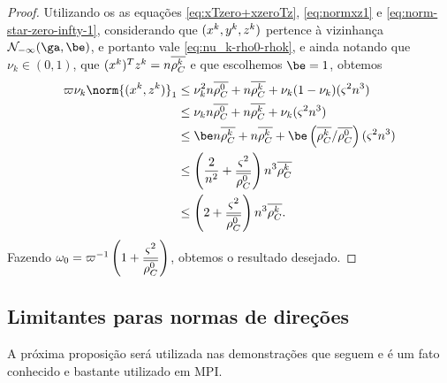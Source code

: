 \begin{proof}
Utilizando os as equações \eqref{eq:xTzero+xzeroTz},  \eqref{eq:normxz1} e \eqref{eq:norm-star-zero-infty-1}, considerando que $(x^{k},y^{k},z^{k})$ pertence à vizinhança $\Nset_{-\infty}(\ga,\be)$, e portanto vale  \eqref{eq:nu_k-rho0-rhok}, e ainda notando que  $\nu_k\in(0,1)$, que $(x^{k})^{T}z^{k} = n\overline{\rho_{C}^{k}}$ e que escolhemos $\be=1$, obtemos
\begin{align*}
	\bdxzzero\nu_k\norm{(\xk,\zk)}_{1} &\leq \nu_k^{2}n\dbvec{\rho_C^0} + n\dbvec{\rho_C^{k}} + \nu_k(1-\nu_k)(\bdxzstar^{2} n^3 ) \\ 
								&\leq \nu_k n\dbvec{\rho_C^0}+ n\dbvec{\rho_C^{k}} + \nu_k(\bdxzstar^{2} n^3 ) \\ 
								&\leq \be n\dbvec{\rho_C^{k}}+ n\dbvec{\rho_C^{k}} + \be\left(\dbvec{\rho_C^{k}}/\dbvec{\rho_C^{0}}\right)(\bdxzstar^{2} n^3  ) \\	
								&\leq \left(\frac{2}{n^{2}}  + \frac{\bdxzstar^{2}}{\dbvec{\rho_C^{0}}}\right)  n^{3}\dbvec{\rho_C^{k}} \\
								&  \leq \left(2  + \frac{\bdxzstar^{2}}{\dbvec{\rho_C^{0}}}\right)  n^{3}\dbvec{\rho_C^{k}}.								
\end{align*}
Fazendo $\omega_{0} = \varpi^{-1}\left(1  + \dfrac{\varsigma^{2}}{\overline{\rho_C^{0}}}\right)$, obtemos o resultado desejado.
\end{proof}





\subsection{Limitantes paras normas de direções} 

A próxima proposição será utilizada nas demonstrações que seguem e é um fato conhecido e bastante utilizado em \ac{MPI}.

